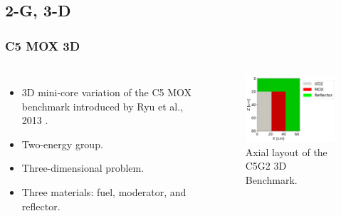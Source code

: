 \subsection{2-G, 3-D}

\begin{frame}
\frametitle{C5 MOX 3D}

\begin{columns}
    \column[t]{4cm}
    \begin{itemize}
        \item 3D mini-core variation of the C5 MOX benchmark introduced by Ryu et al., 2013 \cite{ryu_finite_2013}.
        \item Two-energy group.
        \item Three-dimensional problem.
        \item Three materials: fuel, moderator, and reflector.
    \end{itemize}

    \column[t]{6cm}
    \begin{figure}[htbp!]
        \begin{center}
            \includegraphics[width=6cm]{figures/geo-xz2}
        \end{center}
        \caption{Axial layout of the C5G2 3D Benchmark.}
    \end{figure}
\end{columns}
\end{frame}



